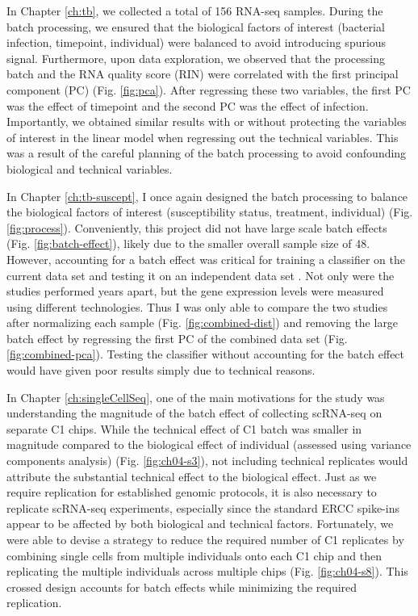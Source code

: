 In Chapter \ref{ch:tb}, we collected a total of 156 RNA-seq
samples. During the batch processing, we ensured that the biological
factors of interest (bacterial infection, timepoint, individual) were
balanced to avoid introducing spurious signal. Furthermore, upon data
exploration, we observed that the processing batch and the RNA quality
score (RIN) were correlated with the first principal component (PC) (Fig. \ref{fig:pca}). After
regressing these two variables, the first PC was the
effect of timepoint and the second PC was the effect of
infection. Importantly, we obtained similar results with or without
protecting the variables of interest in the linear model when
regressing out the technical variables. This was a result of the careful
planning of the batch processing to avoid confounding biological and
technical variables.

In Chapter \ref{ch:tb-suscept}, I once again designed the batch
processing to balance the biological factors of interest
(susceptibility status, treatment, individual) (Fig. \ref{fig:process}). Conveniently, this
project did not have large scale batch effects (Fig. \ref{fig:batch-effect}), likely due to the
smaller overall sample size of 48. However, accounting for a batch
effect was critical for training a classifier on the current data set
and testing it on an independent data set \citep{Barreiro2012}.
Not only were the studies
performed years apart, but the gene expression levels were measured
using different technologies. Thus I was only able to compare the two
studies after normalizing each sample (Fig. \ref{fig:combined-dist}) and removing the large batch
effect by regressing the first PC of the combined
data set (Fig. \ref{fig:combined-pca}). Testing the classifier without accounting for the batch
effect would have given poor results simply due to technical reasons.

In Chapter \ref{ch:singleCellSeq}, one of the main motivations for the
study was understanding the magnitude of the batch effect of
collecting scRNA-seq on separate C1 chips. While the technical effect
of C1 batch was smaller in magnitude compared to the biological effect
of individual (assessed using variance components analysis) (Fig. \ref{fig:ch04-s3}), not
including technical replicates would attribute the substantial
technical effect to the biological effect. Just as we require
replication for established genomic protocols, it is also necessary to
replicate scRNA-seq experiments, especially since the standard ERCC
spike-ins appear to be affected by both biological and technical
factors. Fortunately, we were able to devise a strategy to reduce the
required number of C1 replicates by combining single cells from
multiple individuals onto each C1 chip and then replicating the
multiple individuals across multiple chips (Fig. \ref{fig:ch04-s8}). This crossed design
accounts for batch effects while minimizing the required replication.

